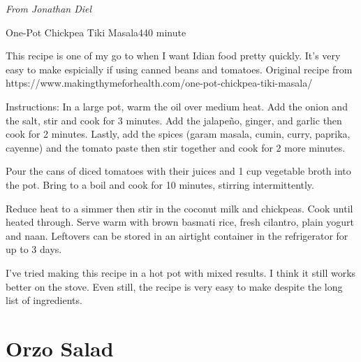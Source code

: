 \documentclass[openany]{book}
\begin{document}
\emph{From Jonathan Diel}

\begin{recipe}{One-Pot Chickpea Tiki Masala}{4}{40 minute}

\freeform This recipe is one of my go to when I want Idian food pretty quickly. It's very easy to make espicially if using canned beans and tomatoes. Original recipe from https://www.makingthymeforhealth.com/one-pot-chickpea-tiki-masala/


Instructions:
In a large pot, warm the oil over medium heat. Add the onion and the salt, stir and cook for 3 minutes. Add the jalapeño, ginger, and garlic then cook for 2 minutes. Lastly, add the spices (garam masala, cumin, curry, paprika, cayenne) and the tomato paste then stir together and cook for 2 more minutes.

Pour the cans of diced tomatoes with their juices and 1 cup vegetable broth into the pot. Bring to a boil and cook for 10 minutes, stirring intermittently.

Reduce heat to a simmer then stir in the coconut milk and chickpeas. Cook until heated through. Serve warm with brown basmati rice, fresh cilantro, plain yogurt and naan. Leftovers can be stored in an airtight container in the refrigerator for up to 3 days.

\freeform I've tried making this recipe in a hot pot with mixed results. I think it still works better on the stove. Even still, the recipe is very easy to make despite the long list of ingredients.

\end{recipe}

\chapter{Orzo Salad}\label{orzo-salad}
\end{document}
